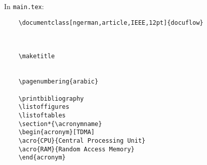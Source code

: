 \noindent In \verb|main.tex|:

\begin{verbatim}
    \documentclass[ngerman,article,IEEE,12pt]{docuflow}


    
    \maketitle
    
    
    \pagenumbering{arabic}
    
    \printbibliography
    \listoffigures
    \listoftables
    \section*{\acronymname}
    \begin{acronym}[TDMA]
    \acro{CPU}{Central Processing Unit}
    \acro{RAM}{Random Access Memory}
    \end{acronym}
    
\end{verbatim}